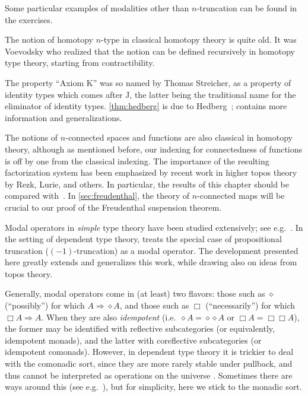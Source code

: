 Some particular examples of modalities other than $n$-truncation can be found in the exercises.


\sectionNotes

The notion of homotopy $n$-type in classical homotopy theory is quite old.
It was Voevodsky who realized that the notion can be defined recursively in homotopy type theory, starting from contractibility.

%
The property ``Axiom K'' was so named by Thomas Streicher, as a property of identity types which comes after J, the latter being the traditional name for the eliminator of identity types.
\cref{thm:hedberg} is due to Hedberg~\cite{hedberg1998coherence}; \cite{krausgeneralizations} contains more information and generalizations.

The notions of $n$-connected spaces and functions are also classical in homotopy theory, although as mentioned before, our indexing for connectedness of functions is off by one from the classical indexing.
The importance of the resulting factorization system has been emphasized by recent work in higher topos theory by Rezk, Lurie, and others.%
In particular, the results of this chapter should be compared with~\cite[\S6.5.1]{lurie:higher-topoi}.
In \cref{sec:freudenthal}, the theory of $n$-connected maps will be crucial to our proof of the Freudenthal suspension theorem.

Modal operators in \emph{simple} type theory have been studied extensively; see e.g.~\cite{modalTT}.  In the setting of dependent type theory, \cite{ab:bracket-types} treats the special case of propositional truncation ($(-1)$-truncation) as a modal operator.  The development presented here greatly extends and generalizes this work, while drawing also on ideas from topos theory.

Generally, modal operators come in (at least) two flavors: those such as $\diamond$ (``possibly'') for which $A\Rightarrow \diamond A$, and those such as $\Box$ (``necessarily'') for which $\Box A \Rightarrow A$.
When they are also \emph{idempotent} (i.e.\ $\diamond A = \diamond{\diamond A}$ or $\Box A = \Box{\Box A}$), the former may be identified with reflective subcategories (or equivalently, idempotent monads), and the latter with coreflective subcategories (or idempotent comonads).
However, in dependent type theory it is trickier to deal with the comonadic sort, since they are more rarely stable under pullback, and thus cannot be interpreted as operations on the universe \UU.
Sometimes there are ways around this (see e.g.~\cite{QGFTinCHoTT12}), but for simplicity, here we stick to the monadic sort.

